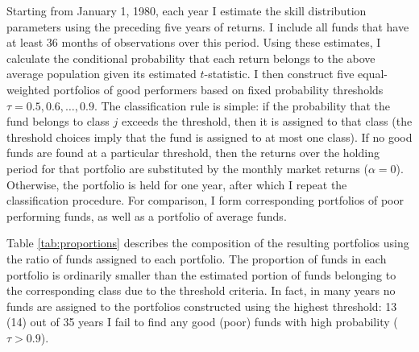 		Starting from January 1, 1980, each year I estimate the skill distribution parameters using the preceding five years of returns. I include all funds that have at least 36 months of observations over this period. Using these estimates, I calculate the conditional probability that each return belongs to the above average population given its estimated $t$-statistic. I then construct five equal-weighted portfolios of good performers based on fixed probability thresholds $\tau = 0.5, 0.6, \dots, 0.9$. The classification rule is simple: if the probability that the fund belongs to class $j$ exceeds the threshold, then it is assigned to that class (the threshold choices imply that the fund is assigned to at most one class). If no good funds are found at a particular threshold, then the returns over the holding period for that portfolio are substituted by the monthly market returns ($\alpha = 0$). Otherwise, the portfolio is held for one year, after which I repeat the classification procedure.  For comparison, I form corresponding portfolios of poor performing funds, as well as a portfolio of average funds.

		Table \ref{tab:proportions} describes the composition of the resulting portfolios using the ratio of funds assigned to each portfolio. The proportion of funds in each portfolio is ordinarily smaller than the estimated portion of funds belonging to the corresponding class due to the threshold criteria. In fact, in many years no funds are assigned to the portfolios constructed using the highest threshold: 13 (14) out of 35 years I fail to find any good (poor) funds with high probability ($\tau > 0.9$).

